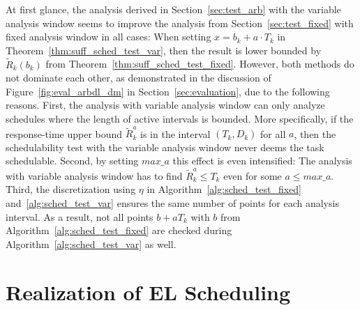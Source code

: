 \documentclass[conference]{IEEEtran}
\theoremstyle{definition}
\theoremstyle{remark}
\newcommand{\Rtilde}{\widetilde{R}}
\begin{document}
At first glance, the analysis derived in Section~\ref{sec:test_arb} with the variable analysis window seems to improve the analysis from Section~\ref{sec:test_fixed} with fixed analysis window in all cases:
When setting $x = b_k + a\cdot T_k$ in Theorem~\ref{thm:suff_sched_test_var}, then the result is lower bounded by $\Rtilde_k(b_k)$ from Theorem~\ref{thm:suff_sched_test_fixed}.
However, both methods do not dominate each other, as demonstrated in the discussion of Figure~\ref{fig:eval_arbdl_dm} in Section~\ref{sec:evaluation}, due to the following reasons.
%
First, the analysis with variable analysis window can only analyze schedules where the length of active intervals is bounded.
More specifically, if the response-time upper bound $\Rtilde^a_k$ is in the interval $(T_k, D_k)$ for all $a$, then the schedulability test with the variable analysis window never deems the task schedulable.
Second, by setting $max\_a$ this effect is even intensified:
The analysis with variable analysis window has to find $\Rtilde^a_k \leq T_k$ even for some $a \leq max\_a$.
Third, the discretization using $\eta$ in Algorithm~\ref{alg:sched_test_fixed} and~\ref{alg:sched_test_var} ensures the same number of points for each analysis interval.
As a result, not all points $b+aT_k$ with $b$ from Algorithm~\ref{alg:sched_test_fixed} are checked during Algorithm~\ref{alg:sched_test_var} as well.



\section{Realization of EL Scheduling}
\label{sec:remark+realization}
\end{document}
